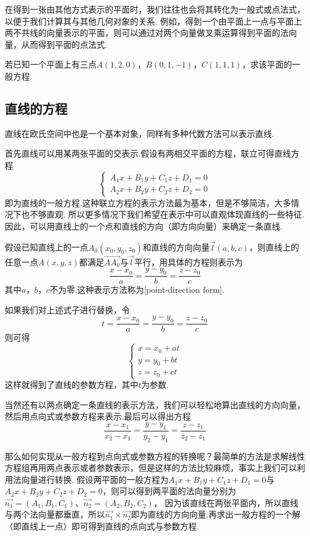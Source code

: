 在得到一张由其他方式表示的平面时，我们往往也会将其转化为一般式或点法式，以便于我们计算其与其他几何对象的关系.
例如，得到一个由平面上一点与平面上两不共线的向量表示的平面，则可以通过对两个向量做叉乘运算得到平面的法向量，从而得到平面的点法式.

\begin{example}
    若已知一个平面上有三点$A(1,2,0)$，$B(0,1,-1)$，$C(1,1,1)$，求该平面的一般方程.
\end{example}

\subsection{直线的方程}
直线在欧氏空间中也是一个基本对象，同样有多种代数方法可以表示直线.

首先直线可以用某两张平面的交表示.假设有两相交平面的方程，联立可得直线方程
$$\begin{cases}
    A_1x+B_1y+C_1z+D_1=0\\
    A_2x+B_2y+C_2z+D_2=0
\end{cases}$$
即为直线的一般方程.这种联立方程的表示方法最为基本，但是不够简洁，大多情况下也不够直观.
所以更多情况下我们希望在表示中可以直观体现直线的一些特征.因此，可以用直线上的一个点和直线的方向（即方向向量）来确定一条直线.

假设已知直线上的一点$A_0(x_0,y_0,z_0)$和直线的方向向量$\vec{l}(a,b,c)$，则直线上的任意一点$A(x,y,z)$都满足$\vec{AA_0}$与$\vec{l}$平行，用具体的方程则表示为
$$\frac{x-x_0}{a}=\frac{y-y_0}{b}=\frac{z-z_0}{c}$$
其中$a$，$b$，$c$不为零.这种表示方法称为[point-direction form].

如果我们对上述式子进行替换，令$$t=\frac{x-x_0}{a}=\frac{y-y_0}{b}=\frac{z-z_0}{c}$$
则可得
$$\begin{cases}
    x=x_0+at\\
    y=y_0+bt\\
    z=z_0+ct
\end{cases}$$
这样就得到了直线的参数方程，其中$t$为参数.

当然还有以两点确定一条直线的表示方法，我们可以轻松地算出直线的方向向量，然后用点向式或参数方程来表示.最后可以得出方程
$$\frac{x-x_1}{x_2-x_1}=\frac{y-y_1}{y_2-y_1}=\frac{z-z_1}{z_2-z_1}$$

那么如何实现从一般方程到点向式或参数方程的转换呢？最简单的方法是求解线性方程组再用两点表示或者参数表示，但是这样的方法比较麻烦，事实上我们可以利用法向量进行转换.
假设两平面的一般方程为$A_1x+B_1y+C_1z+D_1=0$与$A_2x+B_2y+C_2z+D_2=0$，则可以得到两平面的法向量分别为$\vec{n_1}=(A_1,B_1,C_1)$、$\vec{n_2}=(A_2,B_2,C_2)$，
因为该直线在两张平面内，所以直线与两个法向量都垂直，所以$\vec{n_1}\times\vec{n_2}$即为直线的方向向量.再求出一般方程的一个解（即直线上一点）即可得到直线的点向式与参数方程.

